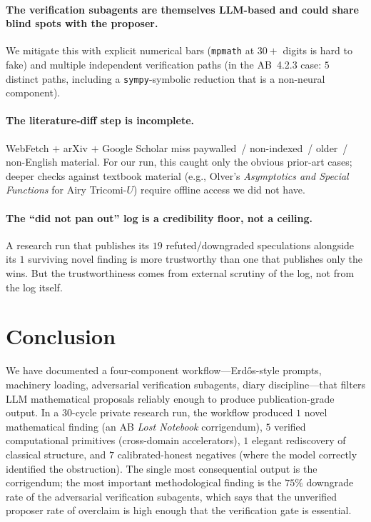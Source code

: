 \documentclass[11pt,reqno]{amsart}
\theoremstyle{definition}
\begin{document}
\paragraph{The verification subagents are themselves LLM-based and
could share blind spots with the proposer.}
We mitigate this with explicit numerical bars (\texttt{mpmath} at
$30+$ digits is hard to fake) and multiple independent verification
paths (in the AB~4.2.3 case: $5$ distinct paths, including a
\texttt{sympy}-symbolic reduction that is a non-neural component).

\paragraph{The literature-diff step is incomplete.}
WebFetch $+$ arXiv $+$ Google Scholar miss paywalled~/ non-indexed~/
older~/ non-English material. For our run, this caught only the
obvious prior-art cases; deeper checks against textbook material
(e.g., Olver's \emph{Asymptotics and Special Functions} for Airy
Tricomi-$U$) require offline access we did not have.

\paragraph{The ``did not pan out'' log is a credibility floor, not a
ceiling.}
A research run that publishes its $19$ refuted/downgraded
speculations alongside its $1$ surviving novel finding is more
trustworthy than one that publishes only the wins. But the
trustworthiness comes from external scrutiny of the log, not from
the log itself.

\section{Conclusion}\label{sec:conclusion}

We have documented a four-component workflow---Erd\H{o}s-style
prompts, machinery loading, adversarial verification subagents,
diary discipline---that filters LLM mathematical proposals reliably
enough to produce publication-grade output. In a $30$-cycle private
research run, the workflow produced $1$ novel mathematical finding
(an AB \emph{Lost Notebook} corrigendum), $5$ verified computational
primitives (cross-domain accelerators), $1$ elegant rediscovery of
classical structure, and $7$ calibrated-honest negatives (where the
model correctly identified the obstruction). The single most
consequential output is the corrigendum; the most important
methodological finding is the $75\%$ downgrade rate of the
adversarial verification subagents, which says that the unverified
proposer rate of overclaim is high enough that the verification gate
is essential.
\end{document}

